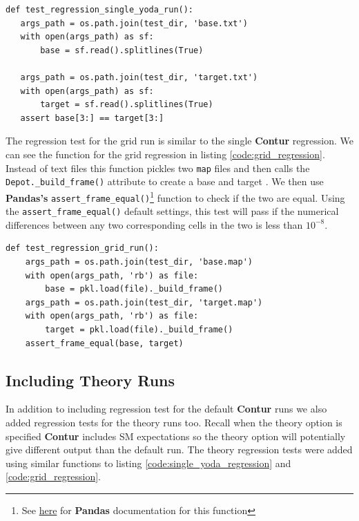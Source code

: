 \begin{code}
\label{code:single_yoda_regression}
\begin{verbatim}
def test_regression_single_yoda_run():
   args_path = os.path.join(test_dir, 'base.txt')
   with open(args_path) as sf:
       base = sf.read().splitlines(True)
    
   args_path = os.path.join(test_dir, 'target.txt')
   with open(args_path) as sf:
       target = sf.read().splitlines(True)
   assert base[3:] == target[3:]
\end{verbatim}
\end{code}

The regression test for the grid run is similar to the single \textbf{Contur} regression. We can see the function for the grid regression in listing \ref{code:grid_regression}. Instead of text files this function pickles two \texttt{map} files and then calls the \texttt{Depot.\_build\_frame()} attribute to create a base and target . We then use \textbf{Pandas's} \texttt{assert\_frame\_equal()}\footnote{See \href{https://pandas.pydata.org/docs/reference/api/pandas.testing.assert_frame_equal.html}{here} for \textbf{Pandas} documentation for this function} function to check if the two  are equal. Using the \texttt{assert\_frame\_equal()} default settings, this test will pass if the numerical differences between any two corresponding cells in the two  is less than $10^{-8}$.

\begin{code}
\label{code:grid_regression}
\begin{verbatim}
def test_regression_grid_run():
    args_path = os.path.join(test_dir, 'base.map')
    with open(args_path, 'rb') as file:
        base = pkl.load(file)._build_frame()
    args_path = os.path.join(test_dir, 'target.map')
    with open(args_path, 'rb') as file:
        target = pkl.load(file)._build_frame()
    assert_frame_equal(base, target)
\end{verbatim}
\end{code}

\subsection{Including Theory Runs}
In addition to including regression test for the default \textbf{Contur} runs we also added regression tests for the theory runs too. Recall when the theory option is specified \textbf{Contur} includes SM expectations so the theory option will potentially give different output than the default run. The theory regression tests were added using similar functions to listing \ref{code:single_yoda_regression} and \ref{code:grid_regression}.


